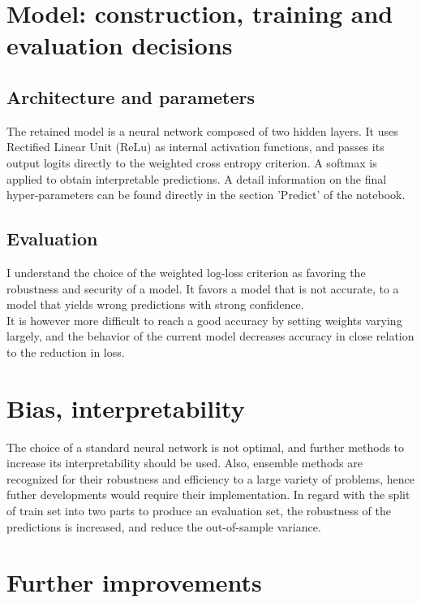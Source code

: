 \documentclass[11pt]{article}
\theoremstyle{definition}
\begin{document}
\section{Model: construction, training and evaluation decisions}

    \subsection{Architecture and parameters}

        The retained model is a neural network composed of two hidden layers. It uses Rectified Linear Unit (ReLu) as internal activation functions, and passes its output logits directly to the weighted cross entropy criterion. A softmax is applied to obtain interpretable predictions. A detail information on the final hyper-parameters can be found directly in the section 'Predict' of the notebook.

    \subsection{Evaluation}

        I understand the choice of the weighted log-loss criterion as favoring the robustness and security of a model. It favors a model that is not accurate, to a model that yields wrong predictions with strong confidence.\\
        It is however more difficult to reach a good accuracy by setting weights varying largely, and the behavior of the current model decreases accuracy in close relation to the reduction in loss.

\section{Bias, interpretability}

        The choice of a standard neural network is not optimal, and further methods to increase its interpretability should be used. Also, ensemble methods are recognized for their robustness and efficiency to a large variety of problems, hence futher developments would require their implementation. In regard with the split of train set into two parts to produce an evaluation set, the robustness of the predictions is increased, and reduce the out-of-sample variance.

\section{Further improvements}
    
\end{document}
